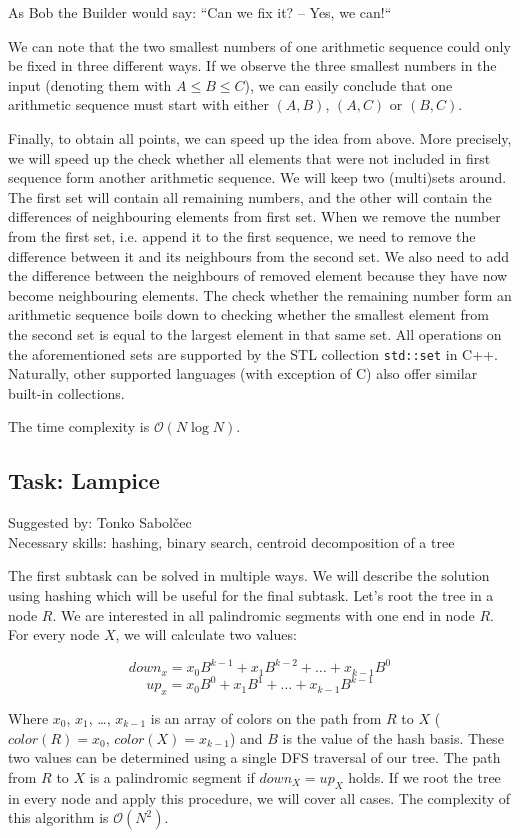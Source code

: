 \documentclass[a4paper]{article}
\begin{document}
As Bob the Builder would say: ``Can we fix it? -- Yes, we can!``

We can note that the two smallest numbers of one arithmetic sequence could only
be fixed in three different ways. If we observe the three smallest numbers in
the input (denoting them with $A \le B \le C$), we can easily conclude that one
arithmetic sequence must start with either $(A, B)$, $(A, C)$ or $(B, C)$.

Finally, to obtain all points, we can speed up the idea from above. More
precisely, we will speed up the check whether all elements that were
not included in first sequence form another arithmetic sequence. We will
keep two (multi)sets around. The first set will contain all remaining numbers, and
the other will contain the differences of neighbouring elements from first
set. When we remove the number from the first set, i.e. append it to the
first sequence, we need to remove the difference between it and its neighbours
from the second set. We also need to add the difference between the neighbours
of removed element because they have now become neighbouring elements. The check
whether the remaining number form an arithmetic sequence boils down to checking
whether the smallest element from the second set is equal to the largest element
in that same set. All operations on the aforementioned sets are supported
by the STL collection \texttt{std::set} in C++. Naturally, other supported
languages (with exception of C) also offer similar built-in collections.

The time complexity is $\mathcal{O}(N \log N)$.

\subsection*{Task: Lampice}
\textsf{Suggested by: Tonko Sabolčec}\\
\textsf{Necessary skills: hashing, binary search, centroid decomposition of a
tree}

The first subtask can be solved in multiple ways. We will describe the solution
using hashing which will be useful for the final subtask. Let's root the tree
in a node $R$. We are interested in all palindromic segments with one end in
node $R$. For every node $X$, we will calculate two values:

\[down_x = x_0B^{k-1} + x_1B^{k-2} + \dots + x_{k-1}B^0\]
\[up_x = x_0B^0 + x_1B^1 + \dots + x_{k-1}B^{k-1}\]

Where $x_0$, $x_1$, \dots, $x_{k-1}$ is an array of colors on the path from
$R$ to $X$ ($color(R) = x_0$, $color(X) = x_{k-1}$) and $B$ is the value
of the hash basis. These two values can be determined using a single DFS
traversal of our tree. The path from $R$ to $X$ is a palindromic segment if
$down_X = up_X$ holds. If we root the tree in every node and apply this
procedure, we will cover all cases. The complexity of this algorithm is
$\mathcal{O}(N^2)$.
\end{document}
